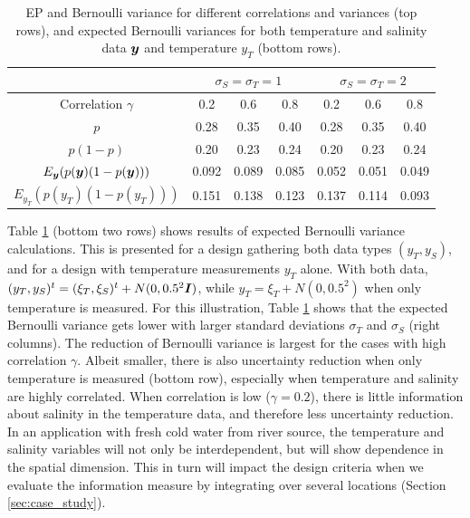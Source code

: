 \documentclass[aoas]{imsart}
\begin{document}
\begin{table}[!h] \centering \caption{EP and Bernoulli variance for
    different correlations and variances (top rows), and expected
    Bernoulli variances for both temperature and salinity data ${\boldsymbol y}$ and 
    temperature $y_T$ (bottom rows).}
  \begin{tabular}{c|ccc|ccc}
 &\multicolumn{3}{c}{$\sigma_S=\sigma_T=1$} & \multicolumn{3}{c}{$\sigma_S=\sigma_T=2$} \\
\hline
Correlation $\gamma$ & 0.2 & 0.6 & 0.8 & 0.2 & 0.6 & 0.8 \\
\hline
$p$ & 0.28 & 0.35 & 0.40 & 0.28 & 0.35 & 0.40 \\ 
$p(1-p)$ & 0.20 & 0.23 & 0.24 & 0.20 & 0.23 & 0.24 \\ 
$E_{{\boldsymbol y}}(p({\boldsymbol y}) (1-p({\boldsymbol y})))$ & 0.092 & 0.089 & 0.085 & 0.052 & 0.051 & 0.049 \\ 
$E_{y_T}(p(y_T) (1-p(y_T)))$ & 0.151 & 0.138 & 0.123 & 0.137 & 0.114 & 0.093 \\ 
\hline
\end{tabular}
\label{tab:sim_rhoab}
\end{table}

Table \ref{tab:sim_rhoab} (bottom two rows) shows results of expected
Bernoulli variance calculations. This is presented for a design
gathering both data types $(y_T,y_S)$, and for a design with
temperature measurements $y_T$ alone. With both data,
$(y_T,y_S)^t=(\xi_T,\xi_S)^t+N(0,0.5^2{\boldsymbol I})$, while
$y_T=\xi_T+N(0,0.5^2)$ when only temperature is measured.  For this illustration, Table \ref{tab:sim_rhoab} shows that the expected Bernoulli variance
gets lower with larger standard deviations $\sigma_T$ and $\sigma_S$
(right columns). The reduction of Bernoulli variance is largest
for the cases with high correlation $\gamma$. Albeit smaller, there is
also uncertainty reduction when only temperature is measured (bottom
row), especially when temperature and salinity are highly correlated. When correlation is low ($\gamma=0.2$), there is little
information about salinity in the temperature data, and therefore less
uncertainty reduction. In an application with fresh cold water from
river source, the temperature and salinity variables will not only be
interdependent, but will show dependence in the spatial
dimension. This in turn will impact the design criteria when we
evaluate the information measure by integrating over several locations (Section \ref{sec:case_study}).

\end{document}
